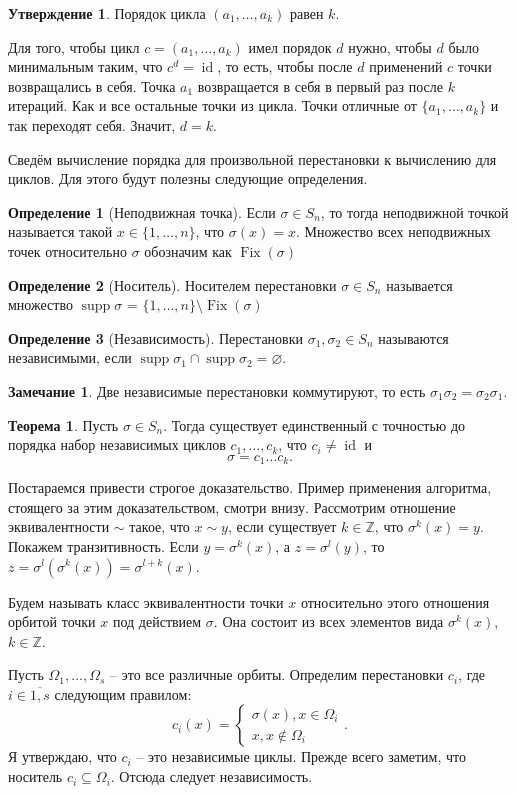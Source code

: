\documentclass[10pt,a4paper,oneside]{book}
\theoremstyle{definition}
\newtheorem*{rem}{\color{green!50!blue}Замечание}
\newtheorem*{defn}{\color{yellow!30!red} Определение}
\newtheorem{thm}{\color{red!40!black}Теорема}
\newtheorem{utvr}{\color{blue!50!black}Утверждение}
\newcommand{\mb}[1]{\mathbb{#1}}
\newcommand{\ovl}{\overline}
\newcommand{\id}{\operatorname{id}}
\newcommand{\Fix}{\operatorname{Fix}}
\newcommand{\supp}{\operatorname{supp}}
\def\thrm{\begin{thm}}
\def\ethrm{\end{thm}}
\def\dfn{\begin{defn}}
\def\edfn{\end{defn}}
\def\rm{\begin{rem}}
\def\erm{\end{rem}}
\def\utv{\begin{utvr}}
\def\eutv{\end{utvr}}
\begin{document}
\utv Порядок цикла $(a_1,\dots,a_k)$ равен $k$.
\eutv
\proof Для того, чтобы цикл $c=(a_1,\dots,a_k)$ имел порядок $d$ нужно, чтобы $d$ было минимальным таким, что $c^d=\id$, то есть, чтобы после $d$ применений $c$ точки возвращались в себя. Точка $a_1$ возвращается в себя в первый раз после $k$ итераций. Как и все остальные точки из цикла. Точки отличные от $\{a_1,\dots,a_k\}$ и так переходят себя. Значит, $d=k$. 
\endproof

Сведём вычисление порядка для произвольной перестановки к вычислению для циклов. Для этого будут полезны следующие определения.

\dfn[Неподвижная точка] Если $\sigma \in S_n$, то тогда неподвижной точкой называется такой $x\in \{1,\dots,n\}$, что $\sigma(x)=x$. Множество всех неподвижных точек относительно $\sigma$ обозначим как $\Fix(\sigma)$ 
\edfn

\dfn[Носитель] Носителем перестановки $\sigma \in S_n$ называется множество $\supp \sigma$ = $\{1,\dots,n\}\setminus \Fix(\sigma)$
\edfn

\dfn[Независимость] Перестановки $\sigma_1,\sigma_2\in S_n$ называются независимыми, если $\supp \sigma_1 \cap \supp \sigma_2=\varnothing$.
\edfn

\rm Две независимые перестановки коммутируют, то есть $\sigma_1\sigma_2=\sigma_2\sigma_1$.
\erm

\thrm Пусть $\sigma \in S_n$. Тогда существует единственный с точностью до порядка набор независимых циклов $c_1,\dots,c_k$, что $c_i\neq \id$ и 
$$\sigma=c_1\dots c_k.$$
\ethrm
\proof Постараемся привести строгое доказательство. Пример применения алгоритма, стоящего за этим доказательством, смотри внизу. Рассмотрим отношение эквивалентности $\sim$ такое, что $x\sim y$, если существует $k\in \mb Z$, что $\sigma^k(x)=y$. Покажем транзитивность. Если $y=\sigma^k(x)$, а $z=\sigma^l(y)$, то $z=\sigma^l(\sigma^k (x))= \sigma^{l+k}(x)$.

Будем называть класс эквивалентности точки $x$ относительно этого отношения орбитой точки $x$ под действием $\sigma$. Она состоит из всех элементов вида $\sigma^k(x)$, $k \in \mb Z$.

Пусть $\Omega_1,\dots,\Omega_s$ -- это все различные орбиты. Определим перестановки $c_i$, где $i\in\ovl{1,s}$ следующим правилом:
$$c_i(x)=\begin{cases} \sigma(x), x\in \Omega_i\\
x, x\notin \Omega_i
\end{cases}.$$
Я утверждаю, что $c_i$ -- это независимые циклы. Прежде всего заметим, что носитель $c_i \subseteq \Omega_i$. Отсюда следует независимость.
\end{document}
